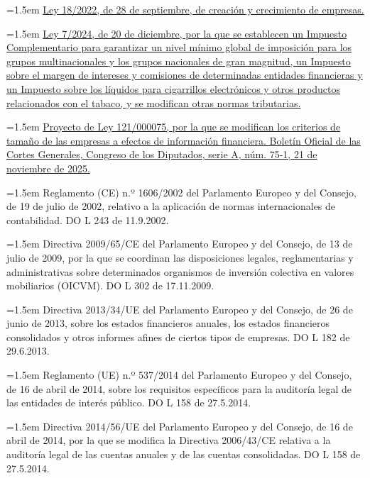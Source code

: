 \documentclass[10pt,a4paper]{article}
\begin{document}
\noindent\hangindent=1.5em \href{https://www.boe.es/eli/es/l/2022/09/28/18/con}{Ley 18/2022, de 28 de septiembre, de creación y crecimiento de empresas.}

\noindent\hangindent=1.5em \href{https://www.boe.es/eli/es/l/2024/12/20/7}{Ley 7/2024, de 20 de diciembre, por la que se establecen un Impuesto Complementario para garantizar un nivel mínimo global de imposición para los grupos multinacionales y los grupos nacionales de gran magnitud, un Impuesto sobre el margen de intereses y comisiones de determinadas entidades financieras y un Impuesto sobre los líquidos para cigarrillos electrónicos y otros productos relacionados con el tabaco, y se modifican otras normas tributarias.}

\noindent\hangindent=1.5em \href{https://www.congreso.es/public_oficiales/L15/CONG/BOCG/A/BOCG-15-A-75-1.PDF}{Proyecto de Ley 121/000075, por la que se modifican los criterios de tamaño de las empresas a efectos de información financiera. Boletín Oficial de las Cortes Generales, Congreso de los Diputados, serie A, núm. 75-1, 21 de noviembre de 2025.}

\noindent\hangindent=1.5em Reglamento (CE) n.º 1606/2002 del Parlamento Europeo y del Consejo, de 19 de julio de 2002, relativo a la aplicación de normas internacionales de contabilidad. DO L 243 de 11.9.2002.

\noindent\hangindent=1.5em Directiva 2009/65/CE del Parlamento Europeo y del Consejo, de 13 de julio de 2009, por la que se coordinan las disposiciones legales, reglamentarias y administrativas sobre determinados organismos de inversión colectiva en valores mobiliarios (OICVM). DO L 302 de 17.11.2009.

\noindent\hangindent=1.5em Directiva 2013/34/UE del Parlamento Europeo y del Consejo, de 26 de junio de 2013, sobre los estados financieros anuales, los estados financieros consolidados y otros informes afines de ciertos tipos de empresas. DO L 182 de 29.6.2013.

\noindent\hangindent=1.5em Reglamento (UE) n.º 537/2014 del Parlamento Europeo y del Consejo, de 16 de abril de 2014, sobre los requisitos específicos para la auditoría legal de las entidades de interés público. DO L 158 de 27.5.2014.

\noindent\hangindent=1.5em Directiva 2014/56/UE del Parlamento Europeo y del Consejo, de 16 de abril de 2014, por la que se modifica la Directiva 2006/43/CE relativa a la auditoría legal de las cuentas anuales y de las cuentas consolidadas. DO L 158 de 27.5.2014.
\end{document}
